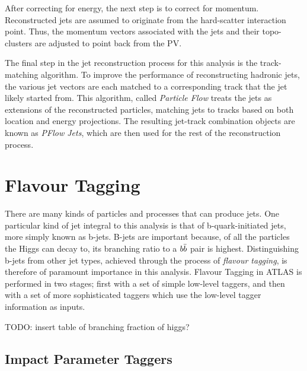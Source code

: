         After correcting for energy, the next step is to correct for momentum.
        Reconstructed jets are assumed to originate from the hard-scatter interaction point.
        Thus, the momentum vectors associated with the jets and their topo-clusters are adjusted to point back from the PV.

        The final step in the jet reconstruction process for this analysis is the track-matching algorithm.
        To improve the performance of reconstructing hadronic jets,
            the various jet vectors are each matched to a corresponding track that the jet likely started from.
        This algorithm, called \textit{Particle Flow} treats the jets as extensions of the reconstructed particles,
            matching jets to tracks based on both location and energy projections.
        The resulting jet-track combination objects are known as \textit{PFlow Jets},
            which are then used for the rest of the reconstruction process\cite{pflow}.


    \FloatBarrier
    \section{Flavour Tagging}
        
        There are many kinds of particles and processes that can produce jets.
        One particular kind of jet integral to this analysis is that of b-quark-initiated jets,
            more simply known as b-jets.
        B-jets are important because, of all the particles the Higgs can decay to,
            its branching ratio to a $b \bar{b}$ pair is highest.
        Distinguishing b-jets from other jet types,
            achieved through the process of \textit{flavour tagging},
            is therefore of paramount importance in this analysis.
        Flavour Tagging in ATLAS is performed in two stages;
            first with a set of simple low-level taggers,
            and then with a set of more sophisticated taggers which use the low-level tagger information as inputs.

        TODO: insert table of branching fraction of higgs?

        \FloatBarrier
        \subsection{Impact Parameter Taggers}

